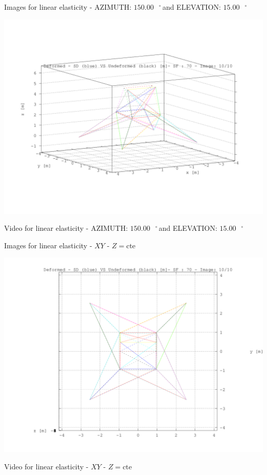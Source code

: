 \documentclass[a4paper,11pt]{article}
\newcommand{\grad}{\hspace{-2.5mm}$\,\phantom{a}^{\circ}\,$}
\begin{document}
\newpage       

\newpage       
\begin{center}       
Images for linear elasticity - AZIMUTH: $150.00$\grad and ELEVATION: $ 15.00$\grad

\includegraphics[width=.80\textwidth]{../../deformed/torre_deformed_10.png}      

Video for linear elasticity - AZIMUTH: $150.00$\grad and ELEVATION: $ 15.00$\grad


\end{center}       
\newpage       
\begin{center}       
Images for linear elasticity -  $XY$ - $Z=\text{cte}$ 

\includegraphics[width=.80\textwidth]{../../XY_XZ_YZ/XY/deformed/torre_deformed_XY_10.png}      


Video for linear elasticity -  $XY$ - $Z=\text{cte}$ 


\end{center}       
\end{document}
